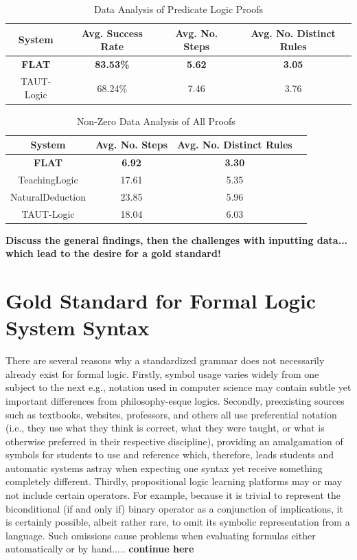 \documentclass[ms]{uncgdissertationexp2}
\theoremstyle{plain}
\theoremstyle{definition}
\theoremstyle{remark}
\begin{document}
\begin{table}[!ht]
	\centering
	\caption{Data Analysis of Predicate Logic Proofs}
	\begin{tabularx}{\textwidth}{*4c}
		\toprule
		System        & Avg. Success Rate & Avg. No. Steps & Avg. No. Distinct Rules \\    
		\midrule
		\textbf{FLAT} & \textbf{83.53\%}  & \textbf{5.62}  & \textbf{3.05}           \\
		TAUT-Logic    & 68.24\%           & 7.46           & 3.76                    \\
		\bottomrule
	\end{tabularx}
	\label{table:predData}
\end{table}

\begin{table}[!ht]
	\centering
	\caption{Non-Zero Data Analysis of All Proofs}
	\begin{tabularx}{\textwidth}{*4c}
		\toprule
		System           & Avg. No. Steps & Avg. No. Distinct Rules \\    
		\midrule
		\textbf{FLAT}    & \textbf{6.92}  & \textbf{3.30}           \\
		TeachingLogic    & 17.61          & 5.35                    \\
		NaturalDeduction & 23.85          & 5.96                    \\
		TAUT-Logic       & 18.04          & 6.03                    \\
		\bottomrule
	\end{tabularx}
	\label{table:nzAllData}
\end{table}

\textbf{Discuss the general findings, then the challenges with inputting data... which lead to the desire for a gold standard!}    

\section{Gold Standard for Formal Logic System Syntax}
There are several reasons why a standardized grammar does not necessarily already exist for formal logic. Firstly, symbol usage varies widely from one subject to the next e.g., notation used in computer science may contain subtle yet important differences from philosophy-esque logics. Secondly, preexisting sources such as textbooks, websites, professors, and others all use preferential notation (i.e., they use what they think is correct, what they were taught, or what is otherwise preferred in their respective discipline), providing an amalgamation of symbols for students to use and reference which, therefore, leads students and automatic systems astray when expecting one syntax yet receive something completely different. Thirdly, propositional logic learning platforms may or may not include certain operators. For example, because it is trivial to represent the biconditional (if and only if) binary operator as a conjunction of implications, it is certainly possible, albeit rather rare, to omit its symbolic representation from a language. Such omissions cause problems when evaluating formulas either automatically or by hand..... \textbf{continue here}
\end{document}
